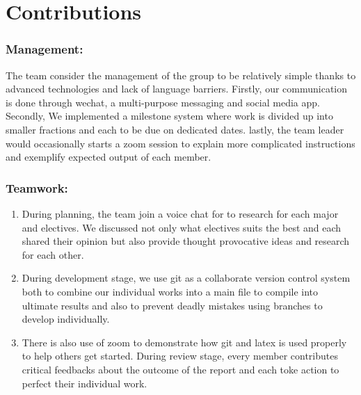 \documentclass{article}
\begin{document}
\section{Contributions}
	\subsubsection{Management:}
	The team consider the management of the group to be relatively simple thanks to advanced technologies and lack of language barriers. Firstly, our communication is done through wechat, a multi-purpose messaging and social media app. Secondly, We implemented a milestone system where work is divided up into smaller fractions and each to be due on dedicated dates. lastly, the team leader would occasionally starts a zoom session to explain more complicated instructions and exemplify expected output of each member.
	\subsubsection{Teamwork:}
	\begin{enumerate}
		\item During planning, the team join a voice chat for to research for each major and electives. We discussed not only what electives suits the best and each shared their opinion but also provide thought provocative ideas and research for each other.
		\item During development stage, we use git as a collaborate version control system both to combine our individual works into a main file to compile into ultimate results and also to prevent deadly mistakes using branches to develop individually. 
		\item There is also use of zoom to demonstrate how git and latex is used properly to help others get started.
	During review stage, every member contributes critical feedbacks about the outcome of the report and each toke action to perfect their individual work.
	\end{enumerate}
	
\end{document}
